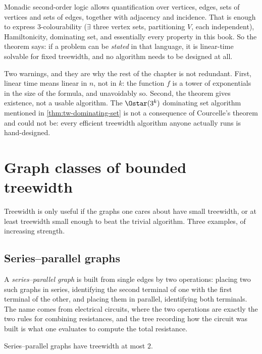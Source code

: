 Monadic second-order logic allows quantification over vertices, edges, sets of
vertices and sets of edges, together with adjacency and incidence. That is
enough to express $3$-colourability ($\exists$ three vertex sets, partitioning
$V$, each independent), Hamiltonicity, dominating set, and essentially every
property in this book. So the theorem says: if a problem can be \emph{stated}
in that language, it is linear-time solvable for fixed treewidth, and no
algorithm needs to be designed at all.

Two warnings, and they are why the rest of the chapter is not redundant. First,
linear time means linear in $n$, not in $k$: the function $f$ is a tower of
exponentials in the size of the formula, and unavoidably so. Second, the
theorem gives existence, not a usable algorithm. The
$\Ostar(3^k)$ dominating set algorithm mentioned in
\cref{thm:tw-dominating-set} is not a consequence of Courcelle's theorem and
could not be: every efficient treewidth algorithm anyone actually runs is
hand-designed.

\section{Graph classes of bounded treewidth}
\label{sec:tw-graph-classes}

Treewidth is only useful if the graphs one cares about have small treewidth, or
at least treewidth small enough to beat the trivial algorithm. Three examples,
of increasing strength.

\subsection{Series--parallel graphs}

A \emph{series--parallel graph} is built from single edges by two operations:
placing two such graphs in series, identifying the second terminal of one with
the first terminal of the other, and placing them in parallel, identifying both
terminals. The name comes from electrical circuits, where the two operations are
exactly the two rules for combining resistances, and the tree recording how the
circuit was built is what one evaluates to compute the total resistance.

\begin{proposition}\label{prop:tw-series-parallel}
Series--parallel graphs have treewidth at most $2$.
\end{proposition}

